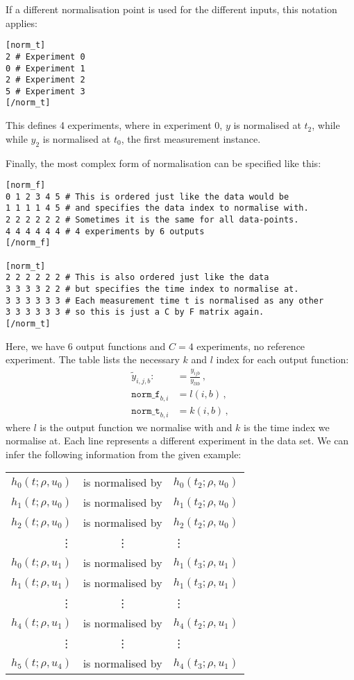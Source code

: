 \documentclass[english,12pt]{scrartcl}
\begin{document}
If a different normalisation point is used for the different inputs, this notation applies:
\begin{lstlisting}
[norm_t]
2 # Experiment 0
0 # Experiment 1
2 # Experiment 2
5 # Experiment 3
[/norm_t]
\end{lstlisting}
This defines 4 experiments, where in experiment $0$, $y$ is normalised at $t_2$, while while $y_2$ is normalised at $t_0$, the first measurement instance.  

Finally, the most complex form of normalisation can be specified like this:
\begin{lstlisting}
[norm_f]
0 1 2 3 4 5 # This is ordered just like the data would be
1 1 1 1 4 5 # and specifies the data index to normalise with.
2 2 2 2 2 2 # Sometimes it is the same for all data-points.
4 4 4 4 4 4 # 4 experiments by 6 outputs
[/norm_f]

[norm_t]
2 2 2 2 2 2 # This is also ordered just like the data
3 3 3 3 2 2 # but specifies the time index to normalise at.
3 3 3 3 3 3 # Each measurement time t is normalised as any other 
3 3 3 3 3 3 # so this is just a C by F matrix again.
[/norm_t]
\end{lstlisting}
Here, we have $6$ output functions and $C=4$ experiments, no reference
experiment. The table lists the necessary $k$ and $l$ index for each output function:
\begin{align}
  \label{eq:norm_ft}
  \tilde y_{i,j,b} :&= \frac{y_{ijb}}{y_{lkb}}\,,\\
  \texttt{norm\_f}_{b,i} &= l(i,b)\,,\\
  \texttt{norm\_t}_{b,i} &= k(i,b)\,,
\end{align}
where $l$ is the output function we normalise with and $k$ is the time
index we normalise at. Each line represents a different experiment in
the data set.  We can infer the following information from the given
example:
\begin{center}
\begin{tabular}{rcl}
 $h_0(t;\rho,u_0)$ &is normalised by& $h_0(t_2;\rho,u_0)$\\
 $h_1(t;\rho,u_0)$ &is normalised by& $h_1(t_2;\rho,u_0)$\\
 $h_2(t;\rho,u_0)$ &is normalised by& $h_2(t_2;\rho,u_0)$\\
  \vdots&\vdots&\vdots\\
 $h_0(t;\rho,u_1)$ &is normalised by& $h_1(t_3;\rho,u_1)$\\
 $h_1(t;\rho,u_1)$ &is normalised by& $h_1(t_3;\rho,u_1)$\\
  \vdots&\vdots&\vdots\\
 $h_4(t;\rho,u_1)$ &is normalised by& $h_4(t_2;\rho,u_1)$\\
  \vdots&\vdots&\vdots\\
 $h_5(t;\rho,u_4)$ &is normalised by& $h_4(t_3;\rho,u_1)$\\
\end{tabular}
\end{center}
 
\end{document}
